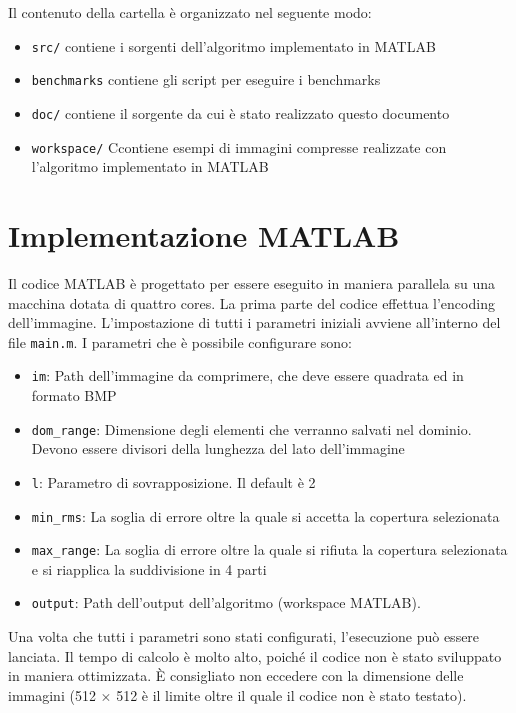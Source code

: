 \documentclass[11pt,a4paper,appendixprefix=true,numbers=noenddot]{scrreprt}
\begin{document}
Il contenuto della cartella è organizzato nel seguente modo:

\begin{itemize}
\item \texttt{src/} contiene i sorgenti dell'algoritmo implementato in MATLAB
\item \texttt{benchmarks} contiene gli script per eseguire i benchmarks
\item \texttt{doc/} contiene il sorgente da cui è stato realizzato questo documento
\item \texttt{workspace/} Ccontiene esempi di immagini compresse realizzate con l'algoritmo implementato in MATLAB
\end{itemize}

\section{Implementazione MATLAB}

Il codice MATLAB è progettato per essere eseguito in maniera parallela su una macchina dotata di quattro cores. La prima parte del codice effettua l'encoding dell'immagine. L'impostazione di tutti i parametri iniziali avviene all'interno del file \texttt{main.m}. I parametri che è possibile configurare sono:

\begin{itemize}
\item \texttt{im}: Path dell'immagine da comprimere, che deve essere quadrata ed in formato BMP
\item \texttt{dom\_range}: Dimensione degli elementi che verranno salvati nel dominio. Devono essere divisori della lunghezza del lato dell'immagine
\item \texttt{l}: Parametro di sovrapposizione. Il default è 2
\item \texttt{min\_rms}: La soglia di errore oltre la quale si accetta la copertura selezionata
\item \texttt{max\_range}: La soglia di errore oltre la quale si rifiuta la copertura selezionata e si riapplica la suddivisione in 4 parti 
\item \texttt{output}: Path dell'output dell'algoritmo (workspace MATLAB).
\end{itemize}

Una volta che tutti i parametri sono stati configurati, l'esecuzione può essere lanciata. Il tempo di calcolo è molto alto, poiché il codice non è stato sviluppato in maniera ottimizzata. È consigliato non eccedere con la dimensione delle immagini (512 $\times$ 512 è il limite oltre il quale il codice non è stato testato).
\end{document}
